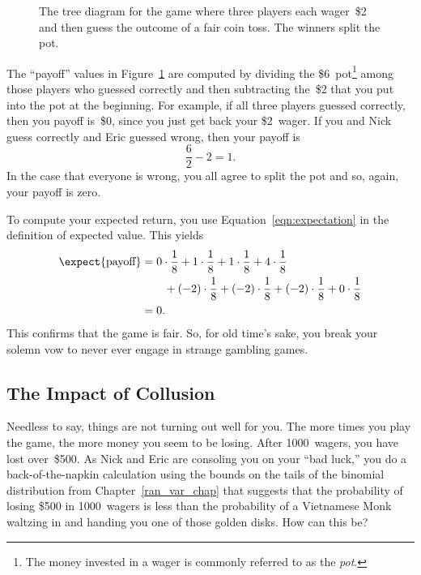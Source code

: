 \begin{figure}



\caption{The tree diagram for the game where three players each
  wager~\$2 and then guess the outcome of a fair coin toss.  The
  winners split the pot.}

\label{fig:17E1}

\end{figure}

The ``payoff'' values in Figure~\ref{fig:17E1} are computed by
dividing the \$6~pot\footnote{The money invested in a wager is
  commonly referred to as the \emph{pot}.} among those players who
guessed correctly and then subtracting the~\$2 that you put into the
pot at the beginning.  For example, if all three players guessed
correctly, then you payoff is~\$0, since you just get back your
\$2~wager.  If you and Nick guess correctly and Eric guessed wrong,
then your payoff is
\begin{equation*}
    \frac{6}{2} - 2 = 1.
\end{equation*}
In the case that everyone is wrong, you all agree to split the pot
and so, again, your payoff is zero.

To compute your expected return, you use
Equation~\ref{eqn:expectation} in the definition of expected value.
This yields
\begin{align*}
\expect{\text{payoff}}
    &= 0 \cdot \frac{1}{8} + 1 \cdot \frac{1}{8} + 1 \cdot \frac{1}{8}
        + 4 \cdot \frac{1}{8} \\
        & \qquad {}+ (-2) \cdot \frac{1}{8} + (-2) \cdot \frac{1}{8}
        + (-2) \cdot \frac{1}{8}
        + 0 \cdot \frac{1}{8} \\
    &= 0.
\end{align*}
This confirms that the game is fair.  So, for old time's sake, you
break your solemn vow to never ever engage in strange gambling games.

\subsection{The Impact of Collusion}

Needless to say, things are not turning out well for you.  The more
times you play the game, the more money you seem to be losing.  After
1000~wagers, you have lost over~\$500.  As Nick and Eric are consoling
you on your ``bad luck,'' you do a back-of-the-napkin calculation
using the bounds on the tails of the binomial distribution from
Chapter~\ref{ran_var_chap} that suggests that the probability of
losing \$500 in 1000~wagers is less than the probability of a
Vietnamese Monk waltzing in and handing you one of those golden disks.
How can this be?

